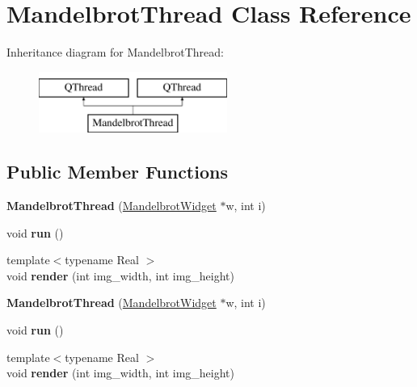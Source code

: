 \hypertarget{class_mandelbrot_thread}{}\section{Mandelbrot\+Thread Class Reference}
\label{class_mandelbrot_thread}
Inheritance diagram for Mandelbrot\+Thread\+:\begin{figure}[H]
\begin{center}
\leavevmode
\includegraphics[height=2.000000cm]{class_mandelbrot_thread}
\end{center}
\end{figure}
\subsection*{Public Member Functions}
\begin{DoxyCompactItemize}
\item 
\mbox{\label{class_mandelbrot_thread_a9a4ef89fdd1b0b92419ba484dd33a036}} 
{\bfseries Mandelbrot\+Thread} (\hyperlink{class_mandelbrot_widget}{Mandelbrot\+Widget} $\ast$w, int i)
\item 
\mbox{\label{class_mandelbrot_thread_a321ae4c34074f6ddd85025196bb89686}} 
void {\bfseries run} ()
\item 
\mbox{\label{class_mandelbrot_thread_a40bf593a592d26253f90880a4c8fb8c8}} 
{\footnotesize template$<$typename Real $>$ }\\void {\bfseries render} (int img\+\_\+width, int img\+\_\+height)
\item 
\mbox{\label{class_mandelbrot_thread_a9a4ef89fdd1b0b92419ba484dd33a036}} 
{\bfseries Mandelbrot\+Thread} (\hyperlink{class_mandelbrot_widget}{Mandelbrot\+Widget} $\ast$w, int i)
\item 
\mbox{\label{class_mandelbrot_thread_a321ae4c34074f6ddd85025196bb89686}} 
void {\bfseries run} ()
\item 
\mbox{\label{class_mandelbrot_thread_a40bf593a592d26253f90880a4c8fb8c8}} 
{\footnotesize template$<$typename Real $>$ }\\void {\bfseries render} (int img\+\_\+width, int img\+\_\+height)
\end{DoxyCompactItemize}
